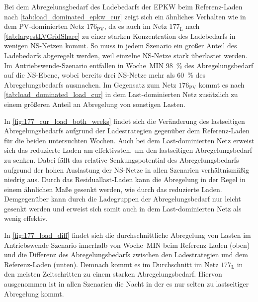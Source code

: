 



Bei dem Abregelunsgbedarf des Ladebedarfs der \gls{EPKW} beim Referenz-Laden nach \autoref{tab:load_dominated_epkw_cur} zeigt sich ein ähnliches Verhalten wie in dem \gls{PV}-dominierten Netz \(176_{\text{PV}}\), da es auch im Netz \(177_{\text{L}}\) nach \autoref{tab:largestLVGridShare} zu einer starken Konzentration des Ladebedarfs in wenigen \gls{NS}-Netzen kommt.
So muss in jedem Szenario ein großer Anteil des Ladebedarfs abgeregelt werden, weil einzelne \gls{NS}-Netze stark überlastet werden.
Im Antriebswende-Szenario entfallen in Woche~MIN \SI{98}{\percent} des Abregelungsbedarf auf die \gls{NS}-Ebene, wobei bereits drei \gls{NS}-Netze mehr als \SI{60}{\percent} des Abregelungsbedarfs ausmachen.
Im Gegensatz zum Netz \(176_{\text{PV}}\) kommt es nach \autoref{tab:load_dominated_load_cur} in dem Last-dominierten Netz zusätzlich zu einem größeren Anteil an Abregelung von sonstigen Lasten.





In \autoref{fig:177_cur_load_both_weeks} findet sich die Veränderung des lastseitigen Abregelungsbedarfs aufgrund der Ladestrategien gegenüber dem Referenz-Laden für die beiden untersuchten Wochen.
Auch bei dem Last-dominierten Netz erweist sich das reduzierte Laden am effektivsten, um den lastseitigen Abregelungsbedarf zu senken.
Dabei fällt das relative Senkungspotential des Abregelungsbedarfs aufgrund der hohen Auslastung der \gls{NS}-Netze in allen Szenarien verhältnismäßig niedrig aus.
Durch das Residuallast-Laden kann die Abregelung in der Regel in einem ähnlichen Maße gesenkt werden, wie durch das reduzierte Laden.
Demgegenüber kann durch die Ladegruppen der Abregelungsbedarf nur leicht gesenkt werden und erweist sich somit auch in dem Last-dominierten Netz als wenig effektiv.



In \autoref{fig:177_load_diff} findet sich die durchschnittliche Abregelung von Lasten im Antriebswende-Szenario innerhalb von Woche~MIN beim Referenz-Laden (oben) und die Differenz des Abregelungsbedarfs zwischen den Ladestrategien und dem Referenz-Laden (unten).
Demnach kommt es im Durchschnitt im Netz \(177_{\text{L}}\) in den meisten Zeitschritten zu einem starken Abregelungsbedarf.
Hiervon ausgenommen ist in allen Szenarien die Nacht in der es nur selten zu lastseitiger Abregelung kommt.\medskip

